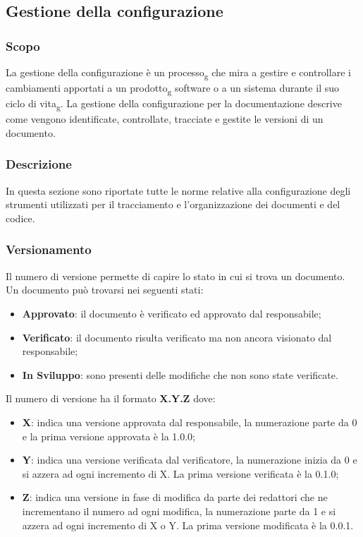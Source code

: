 \subsection{Gestione della configurazione}
\subsubsection{Scopo}
La gestione della configurazione è un processo\textsubscript{g} che mira a gestire e controllare i cambiamenti apportati a un prodotto\textsubscript{g} software o a un sistema durante il suo ciclo di vita\textsubscript{g}. 
La gestione della configurazione per la documentazione descrive come vengono identificate, controllate, tracciate e gestite le versioni di un documento.
\subsubsection{Descrizione}
In questa sezione sono riportate tutte le norme relative alla configurazione degli strumenti utilizzati per il tracciamento e l’organizzazione dei documenti e del codice.
\subsubsection{Versionamento}
Il numero di versione permette di capire lo stato in cui si trova un documento.
Un documento può trovarsi nei seguenti stati:
\begin{itemize} 
    \item \textbf{Approvato}: il documento è verificato ed approvato dal responsabile;
    \item \textbf{Verificato}: il documento risulta verificato ma non ancora visionato dal responsabile;
    \item \textbf{In Sviluppo}: sono presenti delle modifiche che non sono state verificate.
\end{itemize}
Il numero di versione ha il formato \textbf{X.Y.Z} dove:
\begin{itemize} 
    \item \textbf{X}: indica una versione approvata dal responsabile, la numerazione parte da 0
    e la prima versione approvata è la 1.0.0;
    \item \textbf{Y}: indica una versione verificata dal verificatore, la numerazione inizia da 0 e si azzera ad ogni incremento di X. La prima versione
    verificata è la 0.1.0;
    \item \textbf{Z}: indica una versione in fase di modifica da parte dei redattori che ne incrementano il numero ad ogni modifica,
    la numerazione parte da 1 e si azzera ad ogni incremento di X o Y. La prima versione modificata è la 0.0.1.
\end{itemize}

